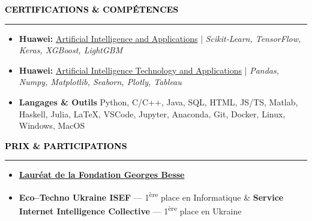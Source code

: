 \documentclass[10pt,english,french]{article}
\makeatletter
\newlength{\mpwidth}
\newcommand{\cvsection}[1]{
    \vspace{4pt}
    \textbf{\fontsize{9pt}{10pt}\selectfont \textcolor{black}{#1}}
    \vspace{6pt}
    \hrule
    \vspace{6pt}
}
\newcommand{\cvevent}[2]{
    \vspace{2pt}
    \parbox{\mpwidth}{
        \begin{tabular*}{1\mpwidth}{@{\extracolsep{\fill}} l r}
            \textcolor{black}{\textbf{\fontsize{11}{12}\selectfont #1}} & \textcolor{black}{\textbf{\fontsize{12}{12}\selectfont #2}} \\
        \end{tabular*}\\[-8pt] %
    }
}
\newcommand{\cvsubevent}[2]{
    \parbox{\mpwidth}{
        \begin{tabular*}{1\mpwidth}{@{\extracolsep{\fill}} l r}
            \textcolor{black}{\textit{\fontsize{10}{12}\selectfont #1}} & \textcolor{black}{\textit{\fontsize{10}{12}\selectfont #2}} \\
        \end{tabular*}\\[-8pt] %
    }
    \vspace{-10pt}
}
\makeatother
\begin{document}

\vspace{-10pt}
\cvsection{CERTIFICATIONS \& COMPÉTENCES}

\vspace{-4pt}
\begin{itemize}[leftmargin=0.5cm, label=\textbullet, itemsep=0.2em]
    \item \textbf{Huawei:} \href{https://github.com/DmytroPalahin/cv-latex-simple-en/blob/main/docs/huawei_artificial_intelligence_and_applications.pdf}{Artificial Intelligence and Applications} | \textit{Scikit-Learn, TensorFlow, Keras, XGBoost, LightGBM}
    \item \textbf{Huawei:} \href{https://github.com/DmytroPalahin/cv-latex-simple-en/blob/main/docs/huawei_artificial_intelligence_technology_and_applications.pdf}{Artificial Intelligence Technology and Applications} | \textit{Pandas, Numpy, Matplotlib, Seaborn, Plotly, Tableau}
    \item \textbf{Langages \& Outils} Python, C/C++, Java, SQL, HTML, JS/TS, Matlab, Haskell, Julia, LaTeX, VSCode, Jupyter, Anaconda, Git, Docker, Linux, Windows, MacOS
\end{itemize}

\vspace{-3pt}
\cvsection{PRIX \& PARTICIPATIONS}

\vspace{-6pt}
\begin{itemize}[leftmargin=0.35cm, label=\textbullet, itemsep=0.15em]
    \item \textbf{\href{https://www.fondationbesse.com/}{Lauréat de la Fondation Georges Besse}}
    \item \textbf{Eco\hspace{3pt}--\hspace{3pt}Techno Ukraine ISEF} --- 1\textsuperscript{ère} place en Informatique \& \textbf{Service Internet Intelligence Collective} --- 1\textsuperscript{ère} place en Ukraine
\end{itemize}
\end{document}
